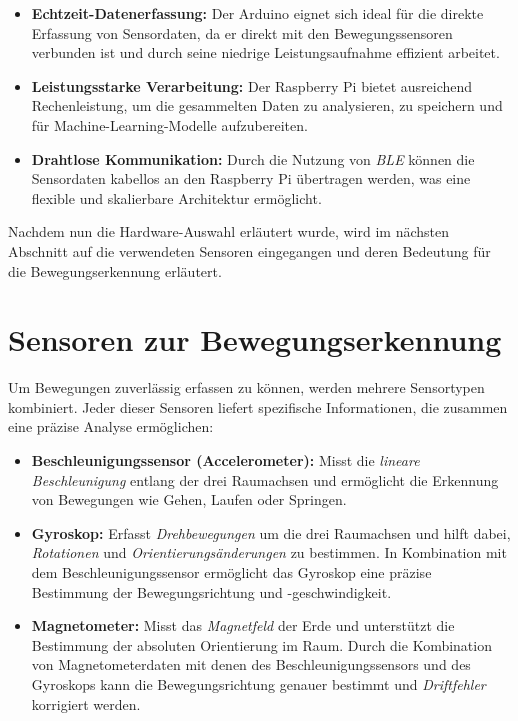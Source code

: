\begin{itemize}
	\item \textbf{Echtzeit-Datenerfassung:} Der Arduino eignet sich ideal für die direkte Erfassung von Sensordaten, da er direkt mit den Bewegungssensoren verbunden ist und durch seine niedrige Leistungsaufnahme effizient arbeitet.
	\item \textbf{Leistungsstarke Verarbeitung:} Der Raspberry Pi bietet ausreichend Rechenleistung, um die gesammelten Daten zu analysieren, zu speichern und für Machine-Learning-Modelle aufzubereiten.
	\item \textbf{Drahtlose Kommunikation:} Durch die Nutzung von \emph{BLE} können die Sensordaten kabellos an den Raspberry Pi übertragen werden, was eine flexible und skalierbare Architektur ermöglicht.
\end{itemize}

Nachdem nun die Hardware-Auswahl erläutert wurde, wird im nächsten Abschnitt auf die verwendeten Sensoren eingegangen und deren Bedeutung für die Bewegungserkennung erläutert.

\section{Sensoren zur Bewegungserkennung}

Um Bewegungen zuverlässig erfassen zu können, werden mehrere Sensortypen kombiniert. Jeder dieser Sensoren liefert spezifische Informationen, die zusammen eine präzise Analyse ermöglichen:

\begin{itemize}
	\item \textbf{Beschleunigungssensor (Accelerometer):} Misst die \emph{lineare Beschleunigung} entlang der drei Raumachsen und ermöglicht die Erkennung von Bewegungen wie Gehen, Laufen oder Springen.
	\item \textbf{Gyroskop:} Erfasst \emph{Drehbewegungen} um die drei Raumachsen und hilft dabei, \emph{Rotationen} und \emph{Orientierungsänderungen} zu bestimmen. In Kombination mit dem Beschleunigungssensor ermöglicht das Gyroskop eine präzise Bestimmung der Bewegungsrichtung und -geschwindigkeit.
	\item \textbf{Magnetometer:} Misst das \emph{Magnetfeld} der Erde und unterstützt die Bestimmung der absoluten Orientierung im Raum. Durch die Kombination von Magnetometerdaten mit denen des Beschleunigungssensors und des Gyroskops kann die Bewegungsrichtung genauer bestimmt und \emph{Driftfehler} korrigiert werden. 
\end{itemize}


